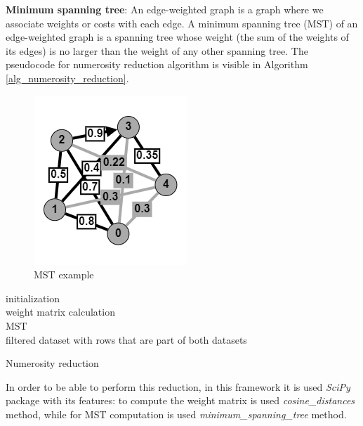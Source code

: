 \documentclass[\main/main.tex]{subfiles}
\begin{document}
\textbf{Minimum spanning tree}: An edge-weighted graph is a graph where we associate weights or costs with each edge. A minimum spanning tree (MST) \cite{books/daglib/0029345} of an edge-weighted graph is a spanning tree whose weight (the sum of the weights of its edges) is no larger than the weight of any other spanning tree. The pseudocode for numerosity reduction algorithm is visible in Algorithm \ref{alg_numerosity_reduction}.
\begin{center}
    \begin{figure}[h]
    \centering
    \includegraphics[scale=1.25]{images/methods/mst_example.png}
    \caption{MST example}
    \label{fig:mst_example}
\end{figure}
\end{center}
\begin{center}
    \begin{algorithm}[H]
     initialization \\
     weight matrix calculation \\
     MST \\
     \Return filtered dataset with rows that are part of both datasets
     \caption{Numerosity reduction}
     \label{alg_numerosity_reduction}
    \end{algorithm}
\end{center}
In order to be able to perform this reduction, in this framework it is used \emph{SciPy} \cite{2020SciPyNMeth} package with its features: to compute the weight matrix is used \emph{cosine\_distances} method, while for MST computation is used \emph{minimum\_spanning\_tree} method.
\end{document}
